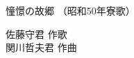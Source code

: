 \documentclass[10pt,b5j]{tarticle} %
\begin{document}
\begin{minipage}[c]{0.7\hsize} %
    \begin{center}
        {\LARGE
            憧憬の故郷 %
        }
        {\small 
            （昭和50年寮歌） %
        }
    \end{center}
\end{minipage}
\begin{minipage}[c]{0.3\hsize} %
    \begin{flushright} %
        佐藤守君 作歌\\関川哲夫君 作曲 %
    \end{flushright}
\end{minipage}
\end{document}
